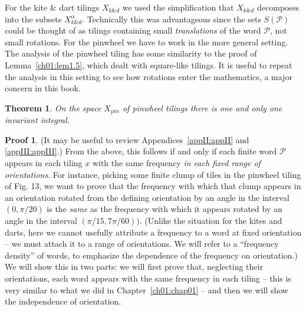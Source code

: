\documentclass[reqno]{stml-l}
\theoremstyle{plain}
\newtheorem{theorem}{Theorem}[chapter]
\theoremstyle{definition}
\newtheorem*{proof*}{Proof}
\numberwithin{equation}{chapter}
\begin{document}
For the kite \& dart tilings $X_{k\& d}$ we used the simplification that $X_{k\& d}$ decomposes into the subsets $X_{k\& d}^{\alpha}$. Technically this was advantageous since the sets $S(\mathcal{P})$ could be thought of as tilings containing small \emph{translations} of the word $\mathcal{P}$, not small rotations. For the pinwheel we have to work in the more general setting. The analysis of the pinwheel tiling has some similarity to the proof of Lemma~\ref{ch01:lem1.5}, which dealt with square-like tilings. It is useful to repeat the analysis in this setting to see how rotations enter the mathematics, a major concern in this book.

\begin{theorem}\label{ch04:thm4.4}
On the space $X_{pin}$ of pinwheel tilings there is one and only one invariant integral.
\end{theorem}

\begin{proof*}
(It may be useful to review Appendices~\ref{appII:appII} and \ref{appIII:appIII}.) From the above, this follows if and only if each finite word $\mathcal{P}$ appears in each tiling $x$ with the same frequency \emph{in each fixed range of orientations}. For instance, picking some finite clump of tiles in the pinwheel tiling of Fig. 13, we want to prove that the frequency with which that clump appears in an orientation rotated from the defining orientation by an angle in the interval $(0, \pi/20)$ is the \emph{same} as the frequency with which it appears rotated by an angle in the interval $(\pi/15,7\pi/60))$. (Unlike the situation for the kites and darts, here we cannot usefully attribute a frequency to a word at fixed orientation --
we must attach it to a range of orientations. We will refer to a ``frequency density'' of words, to emphasize the dependence of the frequency on orientation.) We will show this in two parts: we will first prove that, neglecting their orientations, each word appears with the same frequency in each tiling --
this is very similar to what we did in Chapter~\ref{ch01:chap01} -- and then we will show the independence of orientation.\end{proof*}
\end{document}
